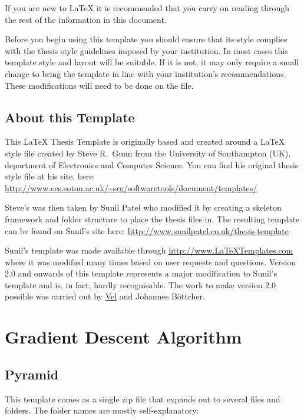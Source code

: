 If you are new to \LaTeX{} it is recommended that you carry on reading through the rest of the information in this document.

Before you begin using this template you should ensure that its style complies with the thesis style guidelines imposed by your institution. In most cases this template style and layout will be suitable. If it is not, it may only require a small change to bring the template in line with your institution's recommendations. These modifications will need to be done on the  file.

\subsection{About this Template}

This \LaTeX{} Thesis Template is originally based and created around a \LaTeX{} style file created by Steve R.\ Gunn from the University of Southampton (UK), department of Electronics and Computer Science. You can find his original thesis style file at his site, here:
\url{http://www.ecs.soton.ac.uk/~srg/softwaretools/document/templates/}

Steve's  was then taken by Sunil Patel who modified it by creating a skeleton framework and folder structure to place the thesis files in. The resulting template can be found on Sunil's site here:
\url{http://www.sunilpatel.co.uk/thesis-template}

Sunil's template was made available through \url{http://www.LaTeXTemplates.com} where it was modified many times based on user requests and questions. Version 2.0 and onwards of this template represents a major modification to Sunil's template and is, in fact, hardly recognisable. The work to make version 2.0 possible was carried out by \href{mailto:vel@latextemplates.com}{Vel} and Johannes Böttcher.


\section{Gradient Descent Algorithm}

\subsection{Pyramid}

This template comes as a single zip file that expands out to several files and folders. The folder names are mostly self-explanatory:

